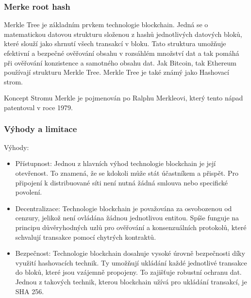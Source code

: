 \subsubsection{Merke root hash}\label{subsubsec:MerkeRootHash}

Merkle Tree je základním prvkem technologie blockchain. Jedná se o matematickou datovou strukturu složenou z hashů jednotlivých datových bloků, které slouží jako shrnutí všech transakcí v bloku. Tato struktura umožňuje efektivní a bezpečné ověřování obsahu v rozsáhlém množství dat a tak pomáhá při ověřování konzistence a samotného obsahu dat. Jak Bitcoin, tak Ethereum používají strukturu Merkle Tree. Merkle Tree je také známý jako Hashovací strom. 

Koncept Stromu Merkle je pojmenován po Ralphu Merkleovi, který tento nápad patentoval v roce 1979.	\cite{Merkle-Tree}







\subsubsection{Výhody a limitace}

Výhody:
\begin{itemize}
	\item Přístupnost: Jednou z hlavních výhod technologie blockchain je její otevřenost. To znamená, že se kdokoli může stát účastníkem a přispět. Pro připojení k distribuované síti není nutná žádná smlouva nebo specifické povolení.
	
	\item Decentralizace: Technologie blockchain je považována za osvobozenou od cenzury, jelikož není ovládána žádnou jednotlivou entitou. Spíše funguje na principu důvěryhodných uzlů pro ověřování a konsenzuálních protokolů, které schvalují transakce pomocí chytrých kontraktů.

	\item Bezpečnost: Technologie blockchain dosahuje vysoké úrovně bezpečnosti díky využití hashovacích technik. Ty umožňují ukládání každé jednotlivé transakce do bloků, které jsou vzájemně propojeny. To zajišťuje robustní ochranu dat. Jednou z takových technik, kterou blockchain užívá pro ukládání transakcí, je SHA 256.

	
\end{itemize}


